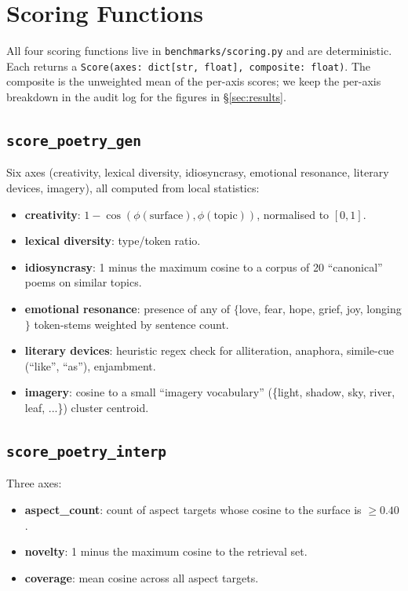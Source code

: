 \section{Scoring Functions}\label{app:scoring}

All four scoring functions live in \texttt{benchmarks/scoring.py} and are deterministic. Each returns a \texttt{Score(axes: dict[str, float], composite: float)}. The composite is the unweighted mean of the per-axis scores; we keep the per-axis breakdown in the audit log for the figures in \S\ref{sec:results}.

\subsection{\texttt{score\_poetry\_gen}}
Six axes (creativity, lexical diversity, idiosyncrasy, emotional resonance, literary devices, imagery), all computed from local statistics:
\begin{itemize}
\item \textbf{creativity}: $1 - \cos(\phi(\text{surface}), \phi(\text{topic}))$, normalised to $[0, 1]$.
\item \textbf{lexical diversity}: type/token ratio.
\item \textbf{idiosyncrasy}: 1 minus the maximum cosine to a corpus of 20 ``canonical'' poems on similar topics.
\item \textbf{emotional resonance}: presence of any of $\{$love, fear, hope, grief, joy, longing$\}$ token-stems weighted by sentence count.
\item \textbf{literary devices}: heuristic regex check for alliteration, anaphora, simile-cue (``like'', ``as''), enjambment.
\item \textbf{imagery}: cosine to a small ``imagery vocabulary'' (\{light, shadow, sky, river, leaf, ...\}) cluster centroid.
\end{itemize}

\subsection{\texttt{score\_poetry\_interp}}
Three axes:
\begin{itemize}
\item \textbf{aspect\_count}: count of aspect targets whose cosine to the surface is $\geq 0.40$.
\item \textbf{novelty}: 1 minus the maximum cosine to the retrieval set.
\item \textbf{coverage}: mean cosine across all aspect targets.
\end{itemize}

